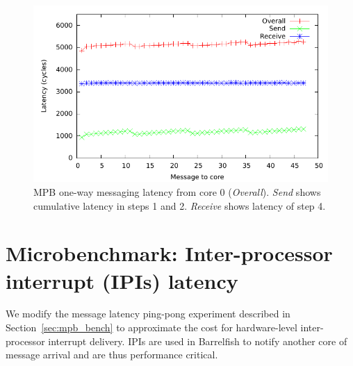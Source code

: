 \documentclass[a4paper,twoside]{report} %
\begin{document}
\begin{figure}
  \centering
  \includegraphics[width=\textwidth]{plots/mpbbench/mpbbench_oneway.pdf}
  \caption{MPB one-way messaging latency from core 0
    (\emph{Overall}). \emph{Send} shows cumulative latency in steps 1
    and 2. \emph{Receive} shows latency of step 4.}
  \label{fig:mpbresults1}
\end{figure}



\section{Microbenchmark: Inter-processor interrupt (IPIs) latency}

We modify the message latency ping-pong experiment described in
Section~\ref{sec:mpb_bench} to approximate the cost for hardware-level
inter-processor interrupt delivery. IPIs are used in Barrelfish to
notify another core of message arrival and are thus performance
critical.
\end{document}
